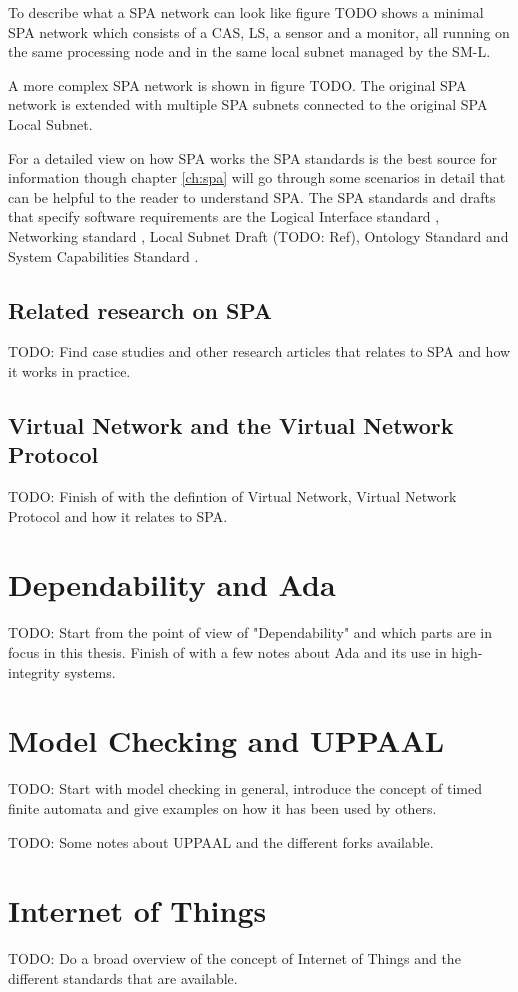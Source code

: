 To describe what a SPA network can look like figure TODO shows a minimal SPA
network which consists of a CAS, LS, a sensor and a monitor, all running on the
same processing node and in the same local subnet managed by the SM-L.

A more complex SPA network is shown in figure TODO. The original SPA network is
extended with multiple SPA subnets connected to the original SPA Local Subnet.

For a detailed view on how SPA works the SPA standards is the best source for
information though chapter \ref{ch:spa} will go through some scenarios in
detail that can be helpful to the reader to understand SPA. The SPA standards
and drafts that specify software requirements are the Logical Interface
standard \cite{spa:logical-interface}, Networking standard
\cite{spa:networking}, Local Subnet Draft (TODO: Ref), Ontology Standard
\cite{spa:ontology} and System Capabilities Standard
\cite{spa:system-capabilities}.

\subsection{Related research on SPA}
TODO: Find case studies and other research articles that relates to SPA and how
it works in practice.

\subsection{Virtual Network and the Virtual Network Protocol}
TODO: Finish of with the defintion of Virtual Network, Virtual Network
Protocol and how it relates to SPA.

\section{Dependability and Ada}
TODO: Start from the point of view of "Dependability" and which parts are in
focus in this thesis. Finish of with a few notes about Ada and its use in
high-integrity systems.

\section{Model Checking and UPPAAL}
TODO: Start with model checking in general, introduce the concept of timed
finite automata and give examples on how it has been used by others.

TODO: Some notes about UPPAAL and the different forks available.

\section{Internet of Things}
TODO: Do a broad overview of the concept of Internet of Things and the
different standards that are available.
